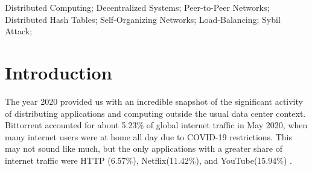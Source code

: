 \documentclass[10pt,conference]{IEEEtran}
\begin{document}
\begin{abstract}
%
%
\end{abstract}


\begin{IEEEkeywords}
	Distributed Computing; Decentralized Systems; Peer-to-Peer Networks;  Distributed Hash Tables; Self-Organizing Networks; Load-Balancing; Sybil Attack;
	
\end{IEEEkeywords}


\section{Introduction}



The year 2020 provided us with an incredible snapshot of the significant activity of distributing applications and computing outside the usual data center context.
Bittorrent \cite{bittorrent} accounted for about 5.23\% of global internet traffic in May 2020, when many internet users were at home all day due to COVID-19 restrictions.
This may not sound like much, but the only applications with a greater share of internet traffic were HTTP (6.57\%), Netflix(11.42\%), and YouTube(15.94\%) \cite{sandvineCOVID2020}.
\end{document}
